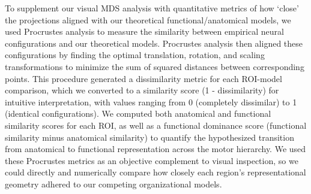 \documentclass{article}
\begin{document}
To supplement our visual MDS analysis with quantitative metrics of how `close' the projections aligned with our theoretical functional/anatomical models, we used Procrustes analysis to measure the similarity between empirical neural configurations and our theoretical models. Procrustes analysis then aligned these configurations by finding the optimal translation, rotation, and scaling transformations to minimize the sum of squared distances between corresponding points. This procedure generated a dissimilarity metric for each ROI-model comparison, which we converted to a similarity score (1 - dissimilarity) for intuitive interpretation, with values ranging from 0 (completely dissimilar) to 1 (identical configurations). We computed both anatomical and functional similarity scores for each ROI, as well as a functional dominance score (functional similarity minus anatomical similarity) to quantify the hypothesized transition from anatomical to functional representation across the motor hierarchy. We used these Procrustes metrics as an objective complement to visual inspection, so we could directly and numerically compare how closely each region's representational geometry adhered to our competing organizational models.




\end{document}
